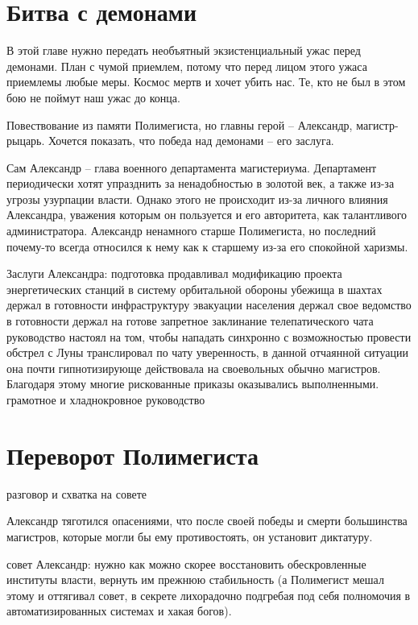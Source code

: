 \documentclass[12pt,a4paper]{article}
\begin{document}
\section*{Битва с демонами}

В этой главе нужно передать необъятный экзистенциальный ужас перед демонами. План с чумой приемлем, потому что перед лицом этого ужаса приемлемы любые меры. Космос мертв и хочет убить нас. Те, кто не был в этом бою не поймут наш ужас до конца.

Повествование из памяти Полимегиста, но главны герой -- Александр, магистр-рыцарь. Хочется показать, что победа над демонами -- его заслуга.

Сам Александр -- глава военного департамента магистериума. Департамент периодически хотят упразднить за ненадобностью в золотой век, а также из-за угрозы узурпации власти. Однако этого не происходит из-за личного влияния Александра, уважения которым он пользуется и его авторитета, как талантливого администратора. Александр ненамного старше Полимегиста, но последний почему-то всегда относился к нему как к старшему из-за его спокойной харизмы.

Заслуги Александра:
подготовка
	продавливал модификацию проекта энергетических станций в систему орбитальной обороны
	убежища в шахтах
	держал в готовности инфраструктуру эвакуации населения
	держал свое ведомство в готовности
	держал на готове запретное заклинание телепатического чата
руководство
	настоял на том, чтобы нападать синхронно с возможностью провести обстрел с Луны
	транслировал по чату уверенность, в данной отчаянной ситуации она почти гипнотизирующе действовала на своевольных обычно магистров. Благодаря этому многие рискованные приказы оказывались выполненными.
	грамотное и хладнокровное руководство


\section*{Переворот Полимегиста}
разговор и схватка на совете

Александр тяготился опасениями, что после своей победы и смерти большинства магистров, которые могли бы ему противостоять, он установит диктатуру. 

совет
Александр: нужно как можно скорее восстановить обескровленные институты власти, вернуть им прежнюю стабильность (а Полимегист мешал этому и оттягивал совет, в секрете лихорадочно подгребая под себя полномочия в автоматизированных системах и хакая богов).
\end{document}
